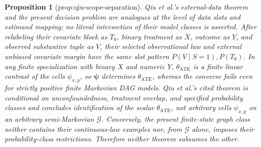 \documentclass{article}
\newtheorem{proposition}{Proposition}
\begin{document}
\begin{proposition}[prop:qiu-scope-separation]\label{prop:qiu-scope-separation}
Qiu et al.'s external-data theorem and the present decision problem are analogues at the level of data slots and estimand mapping; no literal intersection of their model classes is asserted. After relabeling their covariate block as \(T_0\), binary treatment as \(X\), outcome as \(Y\), and observed substantive tuple as \(V\), their selected observational law and external unbiased covariate margin have the same slot pattern \(P(V\mid S=1),P(T_0)\). In any finite specialization with binary \(X\) and numeric \(Y\), \(\theta_{\mathrm{ATE}}\) is a finite linear contrast of the cells \(\psi_{x,y}\), so \(\boldsymbol\psi\) determines \(\theta_{\mathrm{ATE}}\), whereas the converse fails even for strictly positive finite Markovian DAG models. Qiu et al.'s cited theorem is conditional on unconfoundedness, treatment overlap, and specified probability classes and concludes identification of the scalar \(\theta_{\mathrm{ATE}}\), not arbitrary cells \(\psi_{x,y}\) on an arbitrary semi-Markovian \(\mathcal G\). Conversely, the present finite-state graph class neither contains their continuous-law examples nor, from \(\mathcal G\) alone, imposes their probability-class restrictions. Therefore neither theorem subsumes the other.
\end{proposition}
\end{document}
